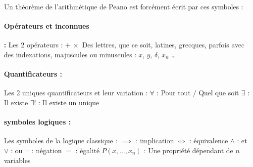 Un théorème de l'arithmétique de Peano est forcément écrit par ces symboles :

\paragraph{Opérateurs et inconnues}
\textbf{:} \newline
Les 2 opérateurs : $+ \ \times$ \newline
Des lettres, que ce soit, latines, grecques, parfois avec des indexations, majuscules ou minuscules : $x$, $y$, $\delta$, $x_n$ \ldots

\paragraph{Quantificateurs :}
Les 2 uniques quantificateurs et leur variation : \newline
$\forall$ : Pour tout / Quel que soit \newline
$\exists$ : Il existe \newline
$\exists!$ : Il existe un unique 

\paragraph{symboles logiques :}
Les symboles de la logique classique : \newline
$\implies$ : implication \newline
$\Longleftrightarrow$ : équivalence \newline
$\wedge$ : et \newline
$\vee$ : ou \newline
$\neg$ : négation \newline
$=$ : égalité \newline
$P(x, \ldots ,x_n)$ : Une propriété dépendant de $n$ variables \newline

